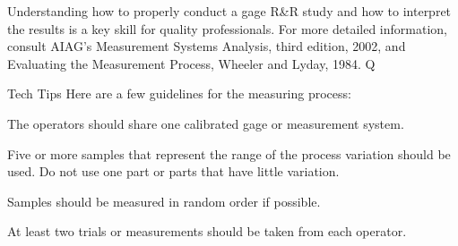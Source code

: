 Understanding how to properly conduct a gage R&R study and how to interpret the results is a key skill for quality professionals. For more detailed information, consult AIAG’s Measurement Systems Analysis, third edition, 2002, and Evaluating the Measurement Process, Wheeler and Lyday, 1984. Q


Tech Tips
Here are a few guidelines for the measuring process:

 \item The operators should share one calibrated gage or measurement system.

 
\item Five or more samples that represent the range of the process variation should be used. Do not use one part or parts that have little variation. 


\item Samples should be measured in random order if possible. 


\item At least two trials or measurements should be taken from each operator. 

